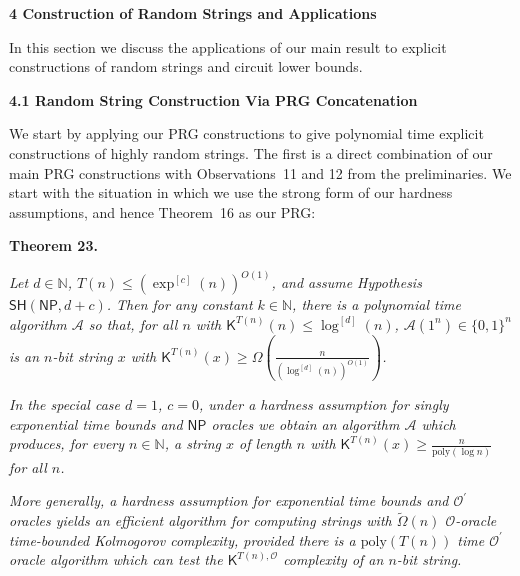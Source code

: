 \par\medskip\noindent\textbf{
4 Construction of Random Strings and Applications}\par




In this section we discuss the applications of our main result to explicit constructions of random strings and circuit lower bounds.\par




\par\medskip\noindent\textbf{
4.1 Random String Construction Via PRG Concatenation}\par




We start by applying our PRG constructions to give polynomial time explicit constructions of highly random strings. The first is a direct combination of our main PRG constructions with Observations 11 and 12 from the preliminaries. We start with the situation in which we use the strong form of our hardness assumptions, and hence Theorem 16 as our PRG:\par





\par\medskip\noindent\textbf{
\textbf{Theorem 23}\textbf{.}
}\par



\emph{Let $d\in\mathbb{N}$, $T(n)\leq(\exp^{[c]}(n))^{O(1)}$, and assume Hypothesis $\mathsf{SH}({\mathsf{NP}},d+c)$. Then for any constant $k\in\mathbb{N}$, there is a polynomial time algorithm $\mathcal{A}$ so that, for all $n$ with ${\mathsf{K}}^{T(n)}(n)\leq\log^{[d]}(n)$, $\mathcal{A}(1^{n})\in\{0,1\}^{n}$ is an $n$-bit string $x$ with ${\mathsf{K}}^{T(n)}(x)\geq\Omega(\frac{n}{(\log^{[d]}(n))^{O(1)}})$.}\par




\emph{In the special case $d=1$, $c=0$, under a hardness assumption for singly exponential time bounds and ${\mathsf{NP}}$ oracles we obtain an algorithm $\mathcal{A}$ which produces, for every $n\in\mathbb{N}$, a string $x$ of length $n$ with ${\mathsf{K}}^{T(n)}(x)\geq\frac{n}{\mathrm{poly}(\log n)}$ for all $n$.}\par




\emph{More generally, a hardness assumption for exponential time bounds and $\mathcal{O^{\prime}}$ oracles yields an efficient algorithm for computing strings with $\tilde{\Omega}(n)$ $\mathcal{O}$-oracle time-bounded Kolmogorov complexity, provided there is a $\mathrm{poly}(T(n))$ time $\mathcal{O^{\prime}}$ oracle algorithm which can test the ${\mathsf{K}}^{T(n),\mathcal{O}}$ complexity of an $n$-bit string.}\par



